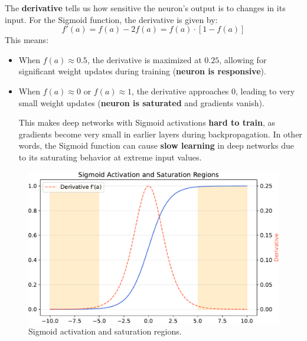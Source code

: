 \noindent
The \textbf{derivative} tells us how sensitive the neuron's output is to changes in its input. For the Sigmoid function, the derivative is given by:
\begin{equation}
    f'(a) = f(a) - 2f(a) = f(a) \cdot \left[1 - f(a)\right]
\end{equation}
This means:
\begin{itemize}
    \item[\textcolor{Green3}{\faIcon{\speedIcon}}] When $f(a) \approx 0.5$, the derivative is maximized at $0.25$, allowing for significant weight updates during training (\textbf{neuron is responsive}).
    \item[\textcolor{Red2}{\faIcon{exclamation-triangle}}] When $f(a) \approx 0$ or $f(a) \approx 1$, the derivative approaches $0$, leading to very small weight updates (\textbf{neuron is saturated} and gradients vanish).
    
    This  makes deep networks with Sigmoid activations \textbf{hard to train}, as gradients become very small in earlier layers during backpropagation. In other words, the Sigmoid function can cause \textbf{slow learning} in deep networks due to its saturating behavior at extreme input values.
\end{itemize}

\begin{figure}[!htp]
    \centering
    \includegraphics[width=\textwidth]{img/fnns/sigmoid-saturation.pdf}
    \caption{Sigmoid activation and saturation regions.}
    \label{fig:sigmoid-saturation}
\end{figure}

